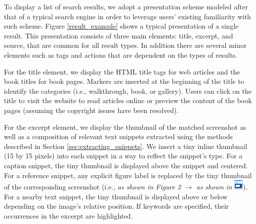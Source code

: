 \documentclass{www2010-submission}
\begin{document}


To display a list of search results, we adopt a presentation scheme 
modeled after that of a typical search engine in order to 
leverage users' existing familiarity with such scheme.  Figure
\ref{result_example} shows a typical presentation of a single
result. This presentation consists of three main elements: title,
excerpt, and source, that are common for all result types. In addition
there are several minor elements such as tags and actions that
are dependent on the types of results.

For the title element, we display the HTML title tags for web articles
and the book titles for book pages. Markers are inserted
at the beginning of the title to identify the categories (i.e.,
walkthrough, book, or gallery). Users can click on the title to
visit the website to read articles online or preview the content of
the book pages (assuming the copyright issues have been resolved).

For the excerpt element, we display the thumbnail of the matched
screenshot as well as a composition of relevant text snippets
extracted using the methods described in Section
\ref{sec:extracting_snippets}. We insert a tiny inline thumbnail (15
by 15 pixels) into each snippet in a way to reflect the snippet's
type. For a caption snippet, the tiny thumbnail is displayed above the
snippet and centered. For a reference snippet, any explicit figure
label is replaced by the tiny thumbnail of the corresponding
screenshot (i.e., \emph{as shown in Figure 2} $\rightarrow$ \emph{as shown in}
\includegraphics[height=0.2in]{figure/tiny.png}). For a nearby text snippet, the
tiny thumbnail is displayed above or below depending on the image's
relative position. If keywords are specified, their occurrences in the
excerpt are highlighted.
\end{document}
